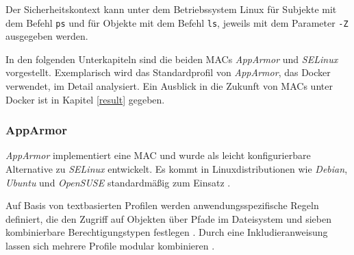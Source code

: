 \documentclass[../main.tex]{subfiles}
\begin{document}
			Der Sicherheitskontext kann unter dem Betriebssystem Linux für Subjekte mit dem Befehl \texttt{ps} und für Objekte mit dem Befehl \texttt{ls}, jeweils mit dem Parameter \texttt{-Z} ausgegeben werden.








			In den folgenden Unterkapiteln sind die beiden MACs \emph{AppArmor} und \emph{SELinux} vorgestellt. Exemplarisch wird das Standardprofil von \emph{AppArmor}, das Docker verwendet, im Detail analysiert. Ein Ausblick in die Zukunft von MACs unter Docker ist in Kapitel \ref{result} gegeben.

			\subsubsection{AppArmor}
				\emph{AppArmor} implementiert eine MAC und wurde als leicht konfigurierbare Alternative zu \emph{SELinux} entwickelt. Es kommt in Linuxdistributionen wie \emph{Debian}, \emph{Ubuntu} und \emph{OpenSUSE} standardmäßig zum Einsatz \cite{apparmorUbuntu}.

				Auf Basis von textbasierten Profilen werden anwendungsspezifische Regeln definiert, die den Zugriff auf Objekten über Pfade im Dateisystem und sieben kombinierbare Berechtigungstypen festlegen \cite{linuxSecOverview}\cite{apparmorQuickProfileLanguage}. Durch eine Inkludieranweisung lassen sich mehrere Profile modular kombinieren \cite{apparmorQuickProfileLanguage}.
\end{document}
